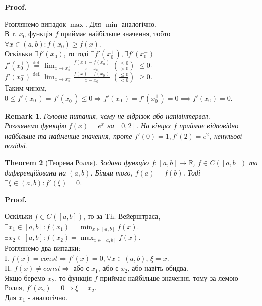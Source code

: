 \documentclass[a4paper, 14pt]{article}
\makeatletter
\def\qed{$\blacksquare$}
\theoremstyle{theoremdd}
\newtheorem{theorem}{Theorem}[subsection]
\theoremstyle{theoremdd}
\theoremstyle{theoremdd}
\theoremstyle{theoremdd}
\theoremstyle{theoremdd}
\theoremstyle{theoremdd}
\newtheorem{remark}[theorem]{Remark}
\theoremstyle{theoremdd}
\theoremstyle{theoremdd}
\renewenvironment{proof}[1][Proof.\\]{\par
\pushQED{\hfill \qed}%
\normalfont \topsep6\p@\@plus6\p@\relax
\trivlist
\item\relax
{\bfseries
#1\@addpunct{.}}\hspace\labelsep\ignorespaces
}{%
\popQED\endtrivlist\@endpefalse
}
\makeatother
\begin{document}
\begin{proof}
Розглянемо випадок $\max$. Для $\min$ аналогічно.\\
В т. $x_0$ функція $f$ приймає найбільше значення, тобто $\forall x \in (a,b): f(x_0) \geq f(x)$.\\
Оскільки $\exists f'(x_0)$, то тоді $\exists f'(x_0^+), \exists f'(x_0^-)$\\
$f'(x_0^+) \displaystyle \overset{\textrm{def.}}{=} \lim_{x \to x_0^+} \frac{f(x)-f(x_0)}{x-x_0}$  $\left( \frac{\leq 0}{> 0} \right)$ $\leq 0$.\\
$f'(x_0^-) \displaystyle \overset{\textrm{def.}}{=} \lim_{x \to x_0^-} \frac{f(x)-f(x_0)}{x-x_0}$ $\left( \frac{\leq 0}{< 0} \right)$ $\geq 0$.\\
Таким чином, $0 \leq f'(x_0^-) = f'(x_0^+) \leq 0 \Rightarrow f'(x_0^-) = f'(x_0^+) = 0 \implies f'(x_0) = 0$.
\end{proof}

\begin{figure}[H]
\centering
{}
\end{figure}

\begin{remark}
Головне питання, чому не відрізок або напівінтервал.\\
Розглянемо функцію $f(x) = e^x$ на $[0,2]$. На кінцях $f$ приймає відповідно найбільше та найменше значення, проте $f'(0) = 1, f'(2) = e^2$, ненульові похідні.
\end{remark}

\begin{theorem}[Теорема Ролля]
Задано функцію $f: [a,b] \to \mathbb{R}$, $f \in C([a,b])$ та диференційована на $(a,b)$. Більш того, $f(a) = f(b)$. Тоді $\exists \xi \in (a,b): f'(\xi) = 0$.
\end{theorem}

\begin{proof}
Оскільки $f \in C([a,b])$, то за Th. Вейерштраса,\\
$\exists x_1 \in [a,b]: f(x_1) = \displaystyle \min_{x \in [a,b]} f(x)$.\\
$\exists x_2 \in [a,b]: f(x_2) = \displaystyle \max_{x \in [a,b]} f(x)$.\\
Розглянемо два випадки:\\
I. $f(x) = const \Rightarrow f'(x) = 0, \forall x \in (a,b)$, $\xi = x$.\\
II. $f(x) \neq const \Rightarrow$ або є $x_1$, або є $x_2$, або навіть обидва.\\
Якщо беремо $x_2$, то функція $f$ приймає найбільше значення, тому за лемою Ролля, $f'(x_2) = 0 \Rightarrow \xi = x_2$.\\
Для $x_1$ - аналогічно.
\end{proof}
\end{document}
